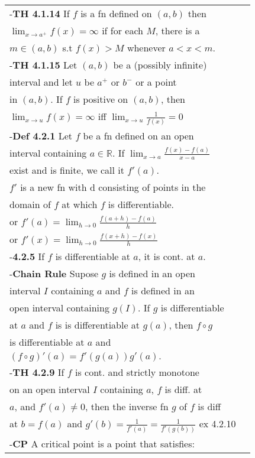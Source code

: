\documentclass[10 pt,landscape]{article}
\begin{document}
\begin{multicols}{4}
\begin{tabular}{@{}ll@{}}
-\textbf{TH 4.1.14} If $f$ is a fn defined on $(a,b)$ then \\$\lim_{x \to a^{+}} f(x)= \infty $ if for each $M$, there is a \\ $m \in (a,b)$ s.t $f(x)>M$ whenever $a<x<m$.\\
-\textbf{TH 4.1.15} Let $(a,b)$ be a (possibly  infinite) \\interval and let $u$ be $a^{+}$ or $b^{-}$ or a point \\in $(a,b)$. If $f$ is positive on $(a,b)$, then\\ $\lim_{x \to u} f(x)= \infty $ iff  $\lim_{x \to u} \frac{1}{f(x)}= 0 $\\
-\textbf{Def 4.2.1} Let $f$ be a fn defined on an open \\interval containing $a \in \mathbb{R}$. If  $\lim_{x \to a} \frac{f(x)-f(a)}{x-a}$ \\ exist and is finite, we call it $f'(a)$.\\
$f'$ is a new fn with d consisting of points in the\\ domain of $f$ at which $f$ is differentiable.\\
or $f'(a)= \lim_{h \to 0} \frac{f(a+h)-f(a)}{h}$\\
or $f'(x)= \lim_{h \to 0} \frac{f(x+h)-f(x)}{h}$\\
-\textbf{4.2.5} If $f$ is differentiable at $a$, it is cont. at $a$.\\
-\textbf{Chain Rule} Supose $g$ is defined in an open\\ interval $I$ containing $a$ and $f$ is defined in an \\ open interval containing $g(I)$. If $g$ is differentiable\\ at $a$ and $f$ is is differentiable at $g(a)$, then $f \circ g$ \\ is differentiable at $a$ and  \\ $(f \circ g)'(a)=f'(g(a))g'(a).$\\
-\textbf{TH 4.2.9} If $f$ is cont. and strictly monotone\\ on an open interval $I$ containing $a$, $f$ is diff. at\\ $a$, and $f'(a) \neq 0$, then the inverse fn $g$ of $f$ is diff\\ at $b=f(a)$ and $g'(b)=\frac{1}{f'(a)}=\frac{1}{f'(g(b))}$ ex 4.2.10\\
-\textbf{CP} A critical point is a point that satisfies:\\

\end{tabular}
\end{multicols}
\end{document}
